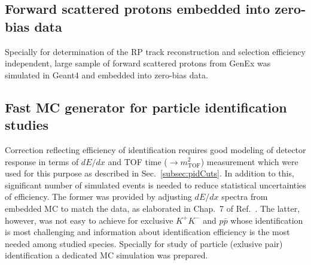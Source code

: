 \subsection{Forward scattered protons embedded into zero-bias data}

Specially for determination of the RP track reconstruction and selection efficiency independent, large sample of forward scattered protons from GenEx was simulated in Geant4 and embedded into zero-bias data.


\subsection{Fast MC generator for particle identification studies}
Correction reflecting efficiency of identification requires good modeling of detector response in terms of $dE/dx$ and TOF time ($\rightarrow m^{2}_{\text{TOF}}$) measurement which were used for this purpose as described in Sec.~\ref{subsec:pidCuts}. In addition to this, significant number of simulated events is needed to reduce statistical uncertainties of efficiency. The former was provided by adjusting $dE/dx$ spectra from embedded MC to match the data, as elaborated in Chap.~7 of Ref.~\cite{supplementaryNote}. The latter, however, was not easy to achieve for exclusive $K^{+}K^{-}$ and $p\bar{p}$ whose identification is most challenging and information about identification efficiency is the most needed among studied species. Specially for study of particle (exlusive pair) identification a dedicated MC simulation was prepared.

